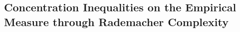 \documentclass{article}
\newcommand{\balpha}{\boldsymbol{\alpha}}
\newcommand{\bTheta}{\boldsymbol{\Theta}}
\newtheorem{lemma}{Lemma}[section]
\newtheorem{remark}{\textbf{Remark}}
\begin{document}





\subsection{Concentration Inequalities on the Empirical Measure through Rademacher Complexity}
\end{document}
